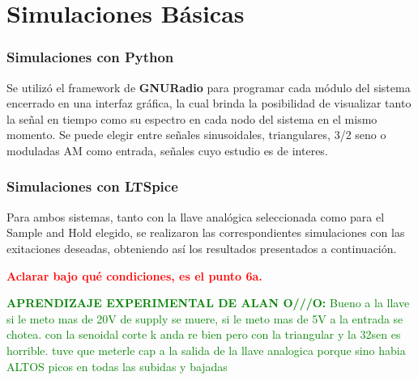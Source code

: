 


\section{Simulaciones Básicas}

\subsubsection{Simulaciones con Python}
Se utilizó el framework de \textbf{GNURadio} para programar cada módulo del sistema encerrado en una interfaz gráfica, la cual brinda la posibilidad de visualizar tanto la señal en tiempo como su espectro en cada nodo del sistema en el mismo momento. Se puede elegir entre señales sinusoidales, triangulares, 3/2 seno o moduladas AM como entrada, señales cuyo estudio es de interes.

\subsubsection{Simulaciones con LTSpice}
Para ambos sistemas, tanto con la llave analógica seleccionada como para el Sample and Hold elegido, se realizaron las correspondientes simulaciones con las exitaciones deseadas, obteniendo así los resultados presentados a continuación.

\textcolor{red}{\textbf{Aclarar bajo qué condiciones, es el punto 6a.}}

\textcolor{green}{\textbf{APRENDIZAJE EXPERIMENTAL DE ALAN O///O:}
Bueno a la llave si le meto mas de 20V de supply se muere, si le meto mas de 5V a la entrada se chotea. con la senoidal corte k anda re bien pero con la triangular y la 32sen es horrible. tuve que meterle cap a la salida de la llave analogica porque sino habia ALTOS picos en todas las subidas y bajadas
}

